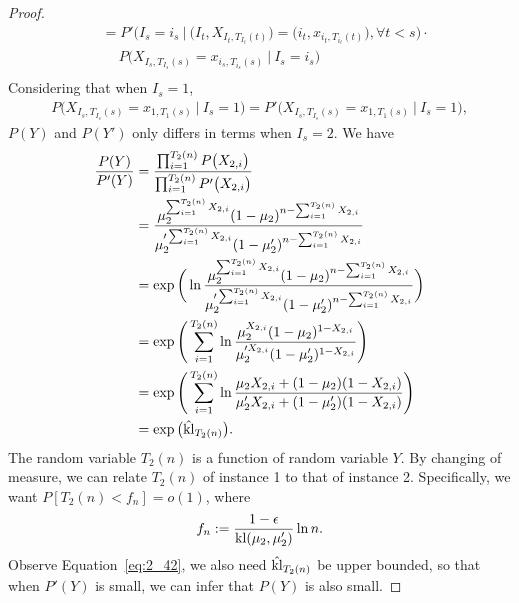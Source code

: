 \begin{proof}
\begin{equation}
\begin{split}
            &=P'\Big(I_s=i_s~\Big|~
            \big(I_t, X_{I_t, T_{I_t}(t)}\big)=\big(i_t, x_{i_t, T_{i_t}(t)}\big), \forall t<s\Big) \cdot \\
            &\quad~P\Big(X_{I_s, T_{I_s}(s)}=x_{i_s, T_{i_s}(s)}~\Big|~I_s=i_s\Big) \\
        \end{split}
    \end{equation}
    Considering that when $I_s=1$,
    \begin{align}
        P\Big(X_{I_s, T_{I_s}(s)}=x_{1, T_{1}(s)}~\Big|~I_s=1\Big) = P'\Big(X_{I_s, T_{I_s}(s)}=x_{1, T_{1}(s)}~\Big|~I_s=1\Big),
    \end{align}
    $P(Y)$ and $P(Y')$ only differs in terms when $I_s=2$.
    We have
    \begin{align}
        \frac{P(Y)}{P'(Y)}
            &= \frac{\prod_{i=1}^{T_2(n)}P\big(X_{2, i}\big)}{\prod_{i=1}^{T_2(n)}P'\big(X_{2, i}\big)} \\
            &= \frac{\mu_2^{\sum_{i=1}^{T_2(n)} X_{2,i}}(1-\mu_2)^{n-\sum_{i=1}^{T_2(n)} X_{2,i}}}
                {\mu_2'^{\sum_{i=1}^{T_2(n)} X_{2,i}}(1-\mu_2')^{n-\sum_{i=1}^{T_2(n)} X_{2,i}}} \\
            &= \exp\bigg(\ln
                \frac{\mu_2^{\sum_{i=1}^{T_2(n)} X_{2,i}}(1-\mu_2)^{n-\sum_{i=1}^{T_2(n)} X_{2,i}}}
                {\mu_2'^{\sum_{i=1}^{T_2(n)} X_{2,i}}(1-\mu_2')^{n-\sum_{i=1}^{T_2(n)} X_{2,i}}}\bigg) \\
            &= \exp\Bigg(\sum_{i=1}^{T_2(n)} \ln
                \frac{\mu_2^{X_{2,i}}(1-\mu_2)^{1-X_{2,i}}}
                {\mu_2'^{X_{2,i}}(1-\mu_2')^{1-X_{2,i}}}\Bigg) \\
            &= \exp\Bigg(\sum_{i=1}^{T_2(n)} \ln
                \frac{\mu_2 X_{2,i} + (1-\mu_2) (1-X_{2,i})}
                {\mu_2' X_{2,i} + (1-\mu_2')(1-X_{2,i})}\Bigg) \\
            &= \exp\big(\hat{{\mathop{\mathrm{kl}}}}_{T_2(n)}\big).\label{eq:2_42}
    \end{align}
    The random variable $T_2(n)$ is a function of random variable $Y$.
    By changing of measure,
    we can relate $T_2(n)$ of instance 1 to that of instance 2.
    Specifically, we want $P[T_2(n)<f_n]=o(1)$, where
    \begin{equation}
        f_n:=\frac{1-\epsilon}{{\mathop{\mathrm{kl}}}(\mu_2,\mu_2')}\ln n.
    \end{equation}
    Observe Equation~\eqref{eq:2_42}, we also need $\hat{{\mathop{\mathrm{kl}}}}_{T_2(n)}$ be upper bounded,
    so that when $P'(Y)$ is small, we can infer that $P(Y)$ is also small.

\end{proof}
